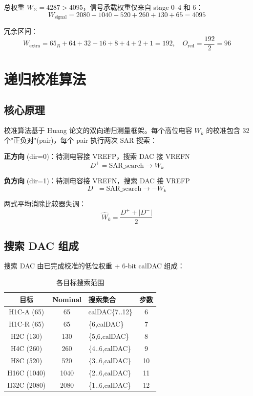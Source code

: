 \documentclass[12pt,a4paper]{article}
\begin{document}
总权重 $W_\Sigma = 4287 > 4095$，信号承载权重仅来自 stage 0--4 和 6：
\begin{equation}
W_{\text{signal}} = 2080+1040+520+260+130+65 = 4095
\end{equation}

冗余区间：
\begin{equation}
W_{\text{extra}} = 65_R+64+32+16+8+4+2+1 = 192,\quad
O_{\text{red}} = \frac{192}{2} = 96
\end{equation}

\section{递归校准算法}

\subsection{核心原理}
校准算法基于 Huang 论文的双向递归测量框架。每个高位电容 $W_k$ 的校准包含 32 个"正负对"(pair)，每个 pair 执行两次 SAR 搜索：

\textbf{正方向} (dir=0)：待测电容接 VREFP，搜索 DAC 接 VREFN
\begin{equation}
D^+ = \text{SAR\_search} \rightarrow W_k
\end{equation}

\textbf{负方向} (dir=1)：待测电容接 VREFN，搜索 DAC 接 VREFP
\begin{equation}
D^- = \text{SAR\_search} \rightarrow -W_k
\end{equation}

两式平均消除比较器失调：
\begin{equation}
\hat W_k = \frac{D^+ + |D^-|}{2}
\end{equation}

\subsection{搜索 DAC 组成}
搜索 DAC 由已完成校准的低位权重 + 6-bit calDAC 组成：

\begin{table}[H]
\centering
\caption{各目标搜索范围}
\label{tab:search_set}
\begin{tabular}{cclc}
\toprule
目标 & Nominal & 搜索集合 & 步数 \\
\midrule
H1C-A (65)  & 65  & calDAC\{7..12\} & 6 \\
H1C-R (65)  & 65  & \{6,calDAC\} & 7 \\
H2C  (130)  & 130 & \{5,6,calDAC\} & 8 \\
H4C  (260)  & 260 & \{4..6,calDAC\} & 9 \\
H8C  (520)  & 520 & \{3..6,calDAC\} & 10 \\
H16C (1040) & 1040 & \{2..6,calDAC\} & 11 \\
H32C (2080) & 2080 & \{1..6,calDAC\} & 12 \\
\bottomrule
\end{tabular}
\end{table}
\end{document}

